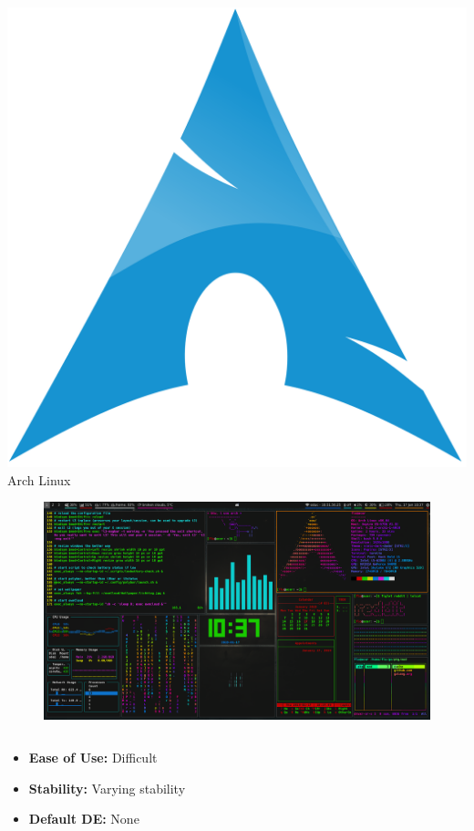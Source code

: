 \documentclass[11pt]{beamer}
\begin{document}
\begin{frame}{\includegraphics[scale=0.007]{arch-logo.png} Arch Linux}
	\begin{figure}
		\includegraphics[scale=0.1]{arch-screenshot.png}
	\end{figure}
	\begin{columns}
		\small
		\begin{column}{0.35\textwidth}
			\begin{itemize}
				\item \textbf{Ease of Use:} Difficult
				\item \textbf{Stability:} Varying stability
				\item \textbf{Default DE:} None

\end{itemize}
\end{column}
\end{columns}
\end{frame}
\end{document}
